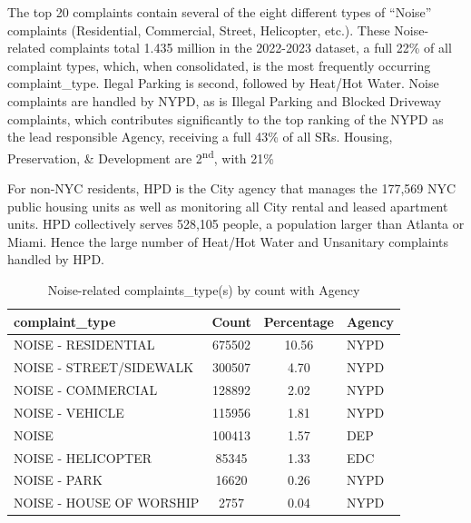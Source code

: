 \documentclass[12pt, titlepage]{article}
\begin{document}
The top 20 complaints contain several of the eight different types of ``Noise'' complaints (Residential, Commercial, Street, Helicopter, etc.). These Noise-related
complaints total 1.435 million in the 2022-2023 dataset, a full 22\% of all complaint types, which, when consolidated, is the most frequently occurring complaint\_type.
Ilegal Parking is second, followed by Heat/Hot Water. Noise complaints are handled by NYPD, as is Illegal Parking and Blocked Driveway complaints, which contributes
significantly to the top ranking of the NYPD as the lead responsible Agency, receiving a full 43\% of all SRs. 
Housing, Preservation, \& Development are 2\textsuperscript{nd}, with 21\%

For  non-NYC residents, HPD is the City agency that manages the 177,569 NYC public housing units as well as monitoring
all City rental and leased apartment units. HPD collectively serves 528,105 people, a population larger than Atlanta or Miami. 
Hence the large number of Heat/Hot Water and Unsanitary complaints handled by HPD. 




\begin{table}[tbp]
    \centering
    \caption{Noise-related complaints\_type(s) by count with Agency}
    \footnotesize
    \begin{tabular}{@{}lS[table-format=7.0,round-mode=places,round-precision=0]S[table-format=2.2,round-mode=places,round-precision=2]l@{}} %
        \toprule
        \textbf{complaint\_type} & \textbf{Count} & \textbf{Percentage} & \textbf{Agency} \\ 
        \midrule
        NOISE - RESIDENTIAL        & 675502 & 10.56 & NYPD  \\ 
        NOISE - STREET/SIDEWALK    & 300507 &  4.70 & NYPD  \\ 
        NOISE - COMMERCIAL         & 128892 &  2.02 & NYPD  \\ 
        NOISE - VEHICLE            & 115956 &  1.81 & NYPD  \\ 
        NOISE                      & 100413 &  1.57 & DEP   \\ 
        NOISE - HELICOPTER         &  85345 &  1.33 & EDC   \\ 
        NOISE - PARK               &  16620 &  0.26 & NYPD  \\ 
        NOISE - HOUSE OF WORSHIP   &   2757 &  0.04 & NYPD  \\ 
        \bottomrule
    \end{tabular}
    \label{tab:noisecomplaints}
\end{table}
\end{document}
